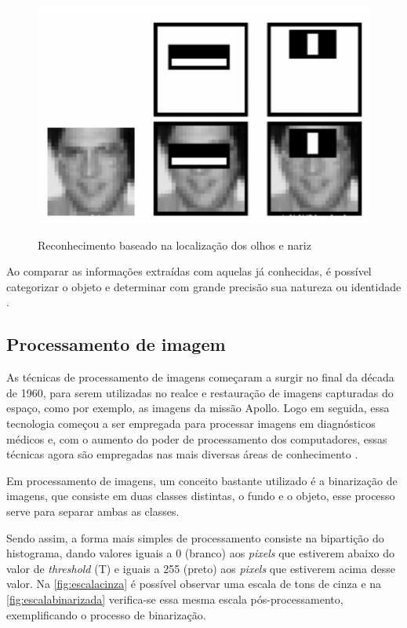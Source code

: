 \begin{figure}[h!]
    \centering
    \caption{Reconhecimento baseado na localização dos olhos e nariz}
    \includegraphics[scale=0.32]{figuras/haarcascate.png}
    \label{fig:haarcascate}
    \centering
\end{figure}

Ao comparar as informações extraídas com aquelas já conhecidas, é possível 
categorizar o objeto e determinar com grande precisão sua natureza 
ou identidade \cite[p. 409]{gonzalez2010}.

\subsection{Processamento de imagem}\label{subsec:processamento}

As técnicas de processamento de imagens começaram a surgir no final da década de 1960, 
para serem utilizadas no realce e restauração de imagens capturadas do espaço, 
como por exemplo, as imagens da missão Apollo. Logo em seguida, essa tecnologia 
começou a ser empregada para processar imagens em diagnósticos médicos e, com 
o aumento do poder de processamento dos computadores, essas técnicas agora 
são empregadas nas mais diversas áreas de conhecimento \cite[p. 2]{gonzalez2010}.

Em processamento de imagens, um conceito bastante utilizado é a binarização de
imagens, que consiste em duas classes distintas, o fundo e o objeto, esse processo 
serve para separar ambas as classes.

Sendo assim, a forma mais simples de processamento consiste na
bipartição do histograma, dando valores iguais a 0 (branco) aos \textit{pixels} que estiverem
abaixo do valor de \textit{threshold} (T) e iguais a 255 (preto) aos \textit{pixels} que estiverem 
acima desse valor. Na \autoref{fig:escalacinza} é possível observar uma escala de 
tons de cinza e na \autoref{fig:escalabinarizada} verifica-se essa mesma escala 
pós-processamento, exemplificando o processo de binarização.

